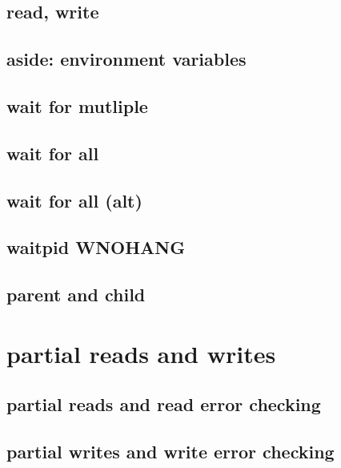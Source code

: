 

\subsection{read, write}






\subsection{aside: environment variables}


\subsection{wait for mutliple}
 

\subsection{wait for all}


\subsection{wait for all (alt)}


\subsection{waitpid WNOHANG}


\subsection{parent and child}




\section{partial reads and writes}
\subsection{partial reads and read error checking}

\subsection{partial writes and write error checking}


